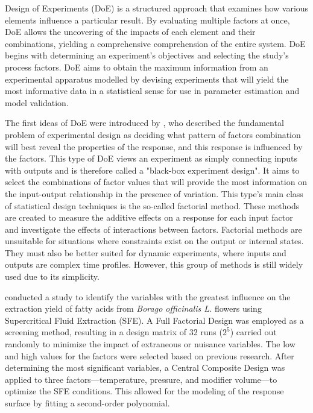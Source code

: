 \documentclass[../Article_Sensitivity_Analsysis.tex]{subfiles}
\begin{document}
	
	Design of Experiments (DoE) is a structured approach that examines how various elements influence a particular result. By evaluating multiple factors at once, DoE allows the uncovering of the impacts of each element and their combinations, yielding a comprehensive comprehension of the entire system. DoE begins with determining an experiment's objectives and selecting the study's process factors. DoE aims to obtain the maximum information from an experimental apparatus modelled by devising experiments that will yield the most informative data in a statistical sense for use in parameter estimation and model validation. 
	
	The first ideas of DoE were introduced by \citet{Fisher1935}, who described the fundamental problem of experimental design as deciding what pattern of factors combination will best reveal the properties of the response, and this response is influenced by the factors. This type of DoE views an experiment as simply connecting inputs with outputs and is therefore called a "black-box experiment design". It aims to select the combinations of factor values that will provide the most information on the input-output relationship in the presence of variation. This type's main class of statistical design techniques is the so-called factorial method. These methods are created to measure the additive effects on a response for each input factor and investigate the effects of interactions between factors. Factorial methods are unsuitable for situations where constraints exist on the output or internal states. They must also be better suited for dynamic experiments, where inputs and outputs are complex time profiles. However, this group of methods is still widely used due to its simplicity.
	
	\citet{Ramandi2011} conducted a study to identify the variables with the greatest influence on the extraction yield of fatty acids from \textit{Borago officinalis L.} flowers using Supercritical Fluid Extraction (SFE). A Full Factorial Design was employed as a screening method, resulting in a design matrix of 32 runs ($2^5$) carried out randomly to minimize the impact of extraneous or nuisance variables. The low and high values for the factors were selected based on previous research. After determining the most significant variables, a Central Composite Design was applied to three factors—temperature, pressure, and modifier volume—to optimize the SFE conditions. This allowed for the modeling of the response surface by fitting a second-order polynomial.
	
\end{document}
